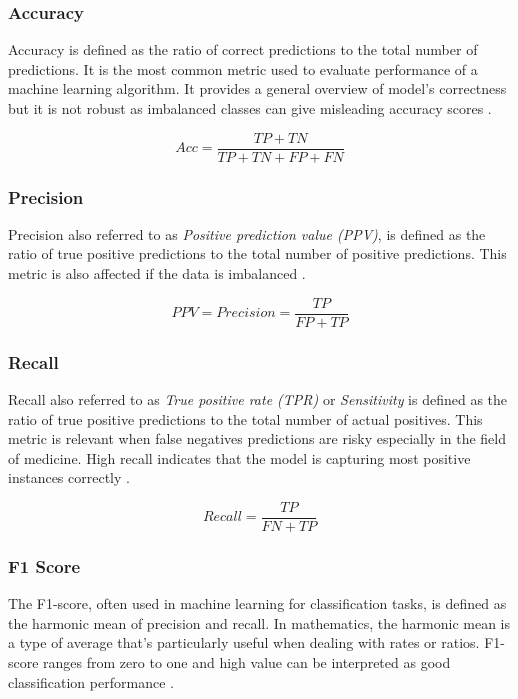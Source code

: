 \subsubsection{Accuracy}
Accuracy is defined as the ratio of correct predictions to the total number of predictions. It is the most common metric used to evaluate performance of a machine learning algorithm. It provides a general overview of model's correctness but it is not robust as imbalanced classes can give misleading accuracy scores \citep{Tharwat2021}.

\begin{equation}\label{eq:acc}
    Acc=\dfrac{TP+TN}{TP+TN+FP+FN}
\end{equation}

\subsubsection{Precision}
Precision also referred to as \textit{Positive prediction value (PPV)}, is defined as the ratio of true positive predictions to the total number of positive predictions. This metric is also affected if the data is imbalanced \citep{Powers2008}.

\begin{equation}\label{eq:precision}
    PPV=Precision=\dfrac{TP}{FP+TP}
\end{equation}

\subsubsection{Recall}
Recall also referred to as \textit{True positive rate (TPR)} or \textit{Sensitivity} is defined as the ratio of true positive predictions to the total number of actual positives. This metric is relevant when false negatives predictions are risky especially in the field of medicine. High recall indicates that the model is capturing most positive instances correctly \citep{Tharwat2021} \citep{Powers2008}.

\begin{equation}\label{eq:recall}
    Recall = \dfrac{TP}{FN+TP}
\end{equation}

\subsubsection{F1 Score}
The F1-score, often used in machine learning for classification tasks, is defined as the harmonic mean of precision and recall. In mathematics, the harmonic mean is a type of average that's particularly useful when dealing with rates or ratios. F1-score ranges from zero to one and high value can be interpreted as good classification performance \citep{Powers2008}. 

